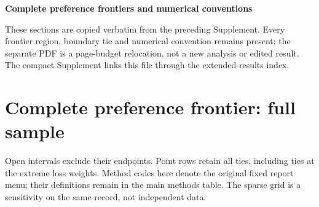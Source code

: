 \documentclass[11pt,a4paper]{article}
\begin{document}
\begin{center}\Large\bfseries Complete preference frontiers and numerical conventions\end{center}
These sections are copied verbatim from the preceding Supplement. Every
frontier region, boundary tie and numerical convention remains present; the
separate PDF is a page-budget relocation, not a new analysis or edited result.
The compact Supplement links this file through the extended-results index.

\section{Complete preference frontier: full sample}\label{sup:frontier-0}

Open intervals exclude their endpoints. Point rows retain all
ties, including ties at the extreme loss weights. Method codes here denote
the original fixed report menu; their definitions remain in the main methods
table. The sparse grid is a sensitivity on the same record, not independent
data.\begingroup
\scriptsize
\setlength{\tabcolsep}{3pt}
\renewcommand{\arraystretch}{2.50}
\end{document}
